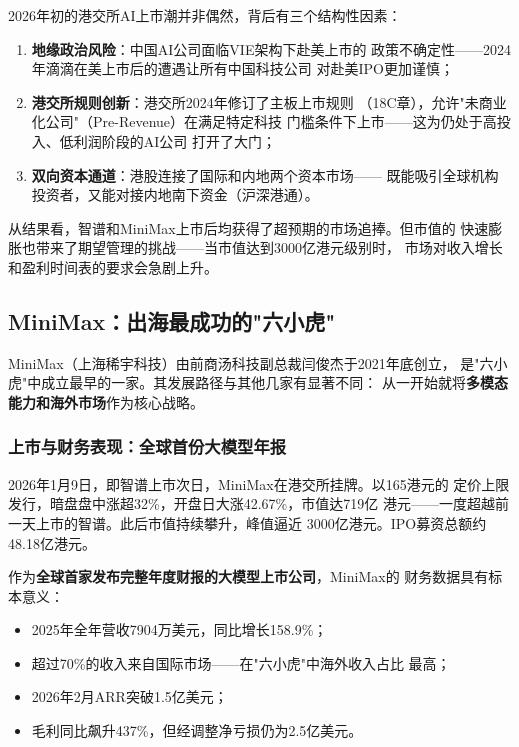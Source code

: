 \begin{whybox}[为什么智谱和MiniMax选择港交所而非美股？]
2026年初的港交所AI上市潮并非偶然，背后有三个结构性因素：
\begin{enumerate}
  \item \textbf{地缘政治风险}：中国AI公司面临VIE架构下赴美上市的
    政策不确定性——2024年滴滴在美上市后的遭遇让所有中国科技公司
    对赴美IPO更加谨慎；
  \item \textbf{港交所规则创新}：港交所2024年修订了主板上市规则
    （18C章），允许"未商业化公司"（Pre-Revenue）在满足特定科技
    门槛条件下上市——这为仍处于高投入、低利润阶段的AI公司
    打开了大门；
  \item \textbf{双向资本通道}：港股连接了国际和内地两个资本市场——
    既能吸引全球机构投资者，又能对接内地南下资金（沪深港通）。
\end{enumerate}
从结果看，智谱和MiniMax上市后均获得了超预期的市场追捧。但市值的
快速膨胀也带来了期望管理的挑战——当市值达到3000亿港元级别时，
市场对收入增长和盈利时间表的要求会急剧上升。
\end{whybox}

\subsection{MiniMax：出海最成功的"六小虎"}
\label{subsec:minimax}

MiniMax（上海稀宇科技）由前商汤科技副总裁闫俊杰于2021年底创立，
是"六小虎"中成立最早的一家。其发展路径与其他几家有显著不同：
从一开始就将\textbf{多模态能力和海外市场}作为核心战略。

\subsubsection{上市与财务表现：全球首份大模型年报}
2026年1月9日，即智谱上市次日，MiniMax在港交所挂牌。以165港元的
定价上限发行，暗盘盘中涨超32\%，开盘日大涨42.67\%，市值达719亿
港元——一度超越前一天上市的智谱。此后市值持续攀升，峰值逼近
3000亿港元。IPO募资总额约48.18亿港元。

作为\textbf{全球首家发布完整年度财报的大模型上市公司}，MiniMax的
财务数据具有标本意义：
\begin{itemize}
  \item 2025年全年营收7904万美元，同比增长158.9\%；
  \item 超过70\%的收入来自国际市场——在"六小虎"中海外收入占比
    最高；
  \item 2026年2月ARR突破1.5亿美元；
  \item 毛利同比飙升437\%，但经调整净亏损仍为2.5亿美元。
\end{itemize}

